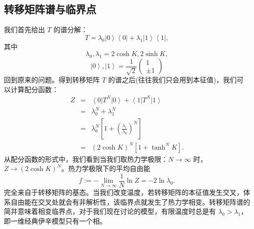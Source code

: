 \documentclass[UTF8]{ctexart}
\begin{document}
\subsection*{转移矩阵谱与临界点}
\noindent
我们首先给出 $T$ 的谱分解：
\begin{equation}
T=\lambda_{0}\left|0\right\rangle \left\langle 0\right|+\lambda_{1}\left|1\right\rangle \left\langle 1\right|,
\end{equation}
其中
\begin{equation}
	\lambda_{0},\lambda_{1}=2\cosh K,2\sinh K,
\end{equation}
\begin{equation}
	\left|0\right\rangle ,\left|1\right\rangle =\frac{1}{\sqrt{2}}\left(\begin{array}{c}
	1\\
	\pm1
	\end{array}\right)
\end{equation}
回到原来的问题。得到转移矩阵 $T$ 的谱之后(往往我们只会用到本征值)，我们可以计算配分函数：
\begin{eqnarray}
Z & = & \left\langle 0\right|T^{N}\left|0\right\rangle +\left\langle 1\right|T^{N}\left|1\right\rangle \nonumber \\
 & = & \lambda_{0}^{N}+\lambda_{1}^{N}\nonumber \\
 & = & \lambda_{0}^{N}\left[1+\left(\frac{\lambda_{1}}{\lambda_{0}}\right)^{N}\right]\nonumber \\
 & = & \left(2\cosh K\right)^{N}\left[1+\tanh^{N}K\right].
\end{eqnarray}
从配分函数的形式中，我们看到当我们取热力学极限：$N\rightarrow\infty$ 时， $Z\rightarrow\left(2\cosh K\right)^{N}$。热力学极限下的平均自由能
\begin{equation}
f:=-\lim_{N\rightarrow\infty}\frac{1}{N}\ln Z=-2\ln\lambda_{0}.
\end{equation}
完全来自于转移矩阵的基态。当我们改变温度，若转移矩阵的本征值发生交叉，体系自由能在交叉处就会有非解析性，该临界点就发生了热力学相变。转移矩阵谱的简并意味着相变临界点，对于我们现在讨论的模型，有限温度时总是有
$\lambda_{0}>\lambda_{1}$，即一维经典伊辛模型只有一个相。
\end{document}
